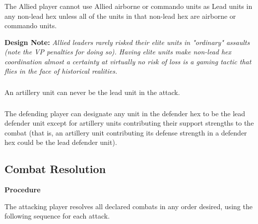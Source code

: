 \subsubsection{}
The Allied player cannot use Allied airborne or commando units as Lead units in any non-lead hex unless all of the units in that non-lead hex are airborne or commando units.

\textbf{Design Note:} \textit{Allied leaders rarely risked their elite units in "ordinary" assaults (note the VP penalties for doing so). Having elite units make non-lead hex coordination almost a certainty at virtually no risk of loss is a gaming tactic that flies in the face of historical realities.}

\subsubsection{}
An artillery unit can never be the lead unit in the attack.

\subsubsection{}
The defending player can designate any unit in the defender hex to be the lead defender unit except for artillery units contributing their support strengths to the combat (that is, an artillery unit contributing its defense strength in a defender hex could be the lead defender unit).

\subsection{Combat Resolution}

\textbf{Procedure}

The attacking player resolves all declared combats in any order desired, using the following sequence for each attack.

